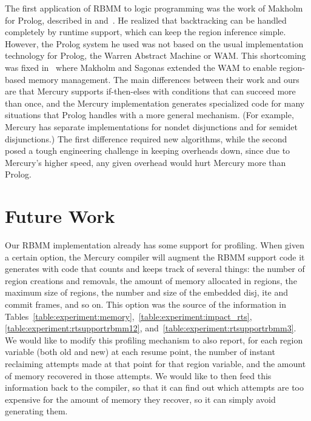 \documentclass{tlp}
\begin{document}
The first application of RBMM to logic programming
was the work of Makholm for Prolog,
described in \cite{Makholm00master} and~\cite{Makholm00}.
He realized that backtracking can be handled completely by runtime support,
which can keep the region inference simple.
However, the Prolog system he used
was not based on the usual implementation technology for Prolog,
the Warren Abstract Machine or WAM.
This shortcoming was fixed in~\cite{MakholmSagonas02}
where Makholm and Sagonas extended the WAM
to enable region-based memory management.
The main differences between their work and ours are that
Mercury supports if-then-elses with conditions
that can succeed more than once,
and the Mercury implementation generates specialized code
for many situations that Prolog handles with a more general mechanism.
(For example, Mercury has separate implementations
for nondet disjunctions and for semidet disjunctions.)
The first difference required new algorithms,
while the second posed a tough engineering challenge in keeping overheads down,
since due to Mercury's higher speed,
any given overhead would hurt Mercury more than Prolog.

\section{Future Work}
\label{seCfuture}

Our RBMM implementation already has some support for profiling.
When given a certain option,
the Mercury compiler will augment the RBMM support code it generates
with code that counts and keeps track of several things:
the number of region creations and removals,
the amount of memory allocated in regions,
the maximum size of regions,
the number and size of the embedded disj, ite and commit frames, and so on.
This option was the source of the information in
Tables~\ref{table:experiment:memory},~\ref{table:experiment:impact_rts},
\ref{table:experiment:rtsupportrbmm12},
and~\ref{table:experiment:rtsupportrbmm3}.
We would like to modify this profiling mechanism to also report,
for each region variable (both old and new) at each resume point,
the number of instant reclaiming attempts made
at that point for that region variable,
and the amount of memory recovered in those attempts.
We would like to then feed this information back to the compiler,
so that it can find out which attempts are too expensive
for the amount of memory they recover,
so it can simply avoid generating them.
\end{document}
